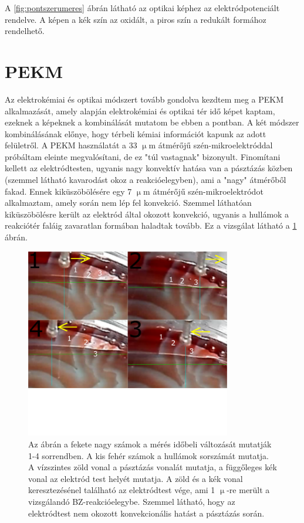 A \ref{fig:pontszerumeres} ábrán látható az optikai képhez az elektródpotenciált rendelve. A képen a kék szín az oxidált, a piros szín a redukált formához rendelhető.

\section{PEKM}
Az elektrokémiai és optikai módszert tovább gondolva kezdtem meg a PEKM alkalmazását, amely alapján elektrokémiai és optikai tér idő képet kaptam, ezeknek a képeknek a kombinálását mutatom be ebben a pontban. A két módszer kombinálásának előnye, hogy térbeli kémiai információt kapunk az adott felületről.
A PEKM használatát a 33 $\upmu$m átmérőjű szén-mikroelektróddal próbáltam eleinte megvalósítani, de ez "túl vastagnak" bizonyult. Finomítani kellett az elektródtesten, ugyanis nagy konvektív hatása van a pásztázás közben (szemmel látható kavarodást okoz a reakcióelegyben), ami a "nagy" átmérőből fakad. Ennek kiküszöbölésére egy 7 $\upmu$m átmérőjű szén-mikroelektródot alkalmaztam, amely során nem lép fel konvekció. Szemmel láthatóan kiküszöbölésre került az elektród által okozott konvekció, ugyanis a hullámok a reakciótér faláig zavaratlan formában haladtak tovább. Ez a  vizsgálat látható a \ref{fig:secmkep} ábrán.
\begin{figure}[h]
\centering
\includegraphics[width=0.8\textwidth]{img/secmkep.png}
\caption{Az ábrán a fekete nagy számok a mérés időbeli változását mutatják 1-4 sorrendben. A kis fehér számok a hullámok sorszámát mutatja. A vízszintes zöld vonal a pásztázás vonalát mutatja, a függőleges kék vonal az elektród test helyét mutatja. A zöld és a kék vonal keresztezésénel található az elektródtest vége, ami 1 $\upmu$-re merült a vizsgálandó BZ-reakcióelegybe. Szemmel látható, hogy az elektródtest nem okozott konvekcionális hatást a pásztázás során.}
\label{fig:secmkep}
\end{figure}

